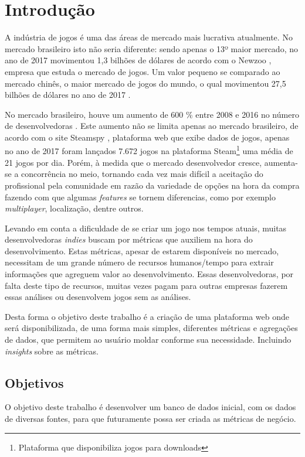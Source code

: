 \chapter[Introdução]{Introdução}
A indústria de jogos é uma das áreas de mercado mais lucrativa atualmente. No mercado brasileiro isto não seria diferente: sendo apenas o 13º maior mercado, no ano de 2017 movimentou 1,3 bilhões de dólares de acordo com o Newzoo \cite{newzoo_brasil}, empresa que estuda o mercado de jogos. Um valor pequeno se comparado ao mercado chinês, o maior mercado de jogos do mundo, o qual movimentou 27,5 bilhões de dólares no ano de 2017 \cite{newzoo_china}.

No mercado brasileiro, houve um aumento de 600 \% entre 2008 e 2016 no número de desenvolvedoras \cite{desenvolvedoras_crescimento}. Este aumento não se limita apenas ao mercado brasileiro, de acordo com o site Steamspy \cite{steam_spy}, plataforma web que exibe dados de jogos, apenas no ano de 2017 foram lançados 7.672 jogos na plataforma Steam\footnote[1]{Plataforma que disponibiliza jogos para downloads} uma média de 21 jogos por dia. Porém, à medida que o mercado desenvolvedor cresce, aumenta-se a concorrência no meio, tornando cada vez mais difícil a aceitação do profissional pela comunidade em razão da variedade de opções  na hora da compra fazendo com que algumas \textit{features} se tornem diferencias, como por exemplo \textit{multiplayer}, localização, dentre outros.

Levando em conta a dificuldade de se criar um jogo nos tempos atuais, muitas desenvolvedoras \textit{indies} buscam por métricas que auxiliem na hora do desenvolvimento. Estas métricas, apesar de estarem disponíveis no mercado, necessitam de um grande número de recursos humanos/tempo para extrair informações que agreguem valor ao desenvolvimento. Essas desenvolvedoras, por falta deste tipo de recursos, muitas vezes pagam para outras empresas fazerem essas análises ou desenvolvem jogos sem as análises.

Desta forma o objetivo deste trabalho é a criação de uma plataforma web onde será disponibilizada, de uma forma mais simples, diferentes métricas e agregações de dados, que permitem ao usuário moldar conforme sua necessidade. Incluindo \textit{insights} sobre as métricas.

\section{Objetivos}
	O objetivo deste trabalho é desenvolver um banco de dados inicial, com os dados de diversas fontes, para que futuramente possa ser criada as métricas de negócio.
	
